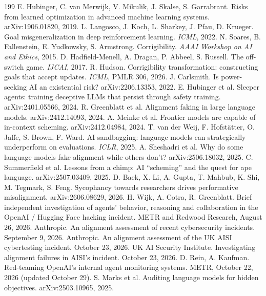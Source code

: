 \documentclass[10pt,twocolumn]{article}
\theoremstyle{plain}
\theoremstyle{definition}
\begin{document}
\begin{thebibliography}{199}
 E. Hubinger, C. van Merwijk, V. Mikulik, J. Skalse, S. Garrabrant. Risks from learned optimization in advanced machine learning systems. arXiv:1906.01820, 2019.
 L. Langosco, J. Koch, L. Sharkey, J. Pfau, D. Krueger. Goal misgeneralization in deep reinforcement learning. \emph{ICML}, 2022.
 N. Soares, B. Fallenstein, E. Yudkowsky, S. Armstrong. Corrigibility. \emph{AAAI Workshop on AI and Ethics}, 2015.
 D. Hadfield-Menell, A. Dragan, P. Abbeel, S. Russell. The off-switch game. \emph{IJCAI}, 2017.
 R. Hudson. Corrigibility transformation: constructing goals that accept updates. \emph{ICML}, PMLR 306, 2026.
 J. Carlsmith. Is power-seeking AI an existential risk? arXiv:2206.13353, 2022.
 E. Hubinger et al. Sleeper agents: training deceptive LLMs that persist through safety training. arXiv:2401.05566, 2024.
 R. Greenblatt et al. Alignment faking in large language models. arXiv:2412.14093, 2024.
 A. Meinke et al. Frontier models are capable of in-context scheming. arXiv:2412.04984, 2024.
 T. van der Weij, F. Hofst\"atter, O. Jaffe, S. Brown, F. Ward. AI sandbagging: language models can strategically underperform on evaluations. \emph{ICLR}, 2025.
 A. Sheshadri et al. Why do some language models fake alignment while others don't? arXiv:2506.18032, 2025.
 C. Summerfield et al. Lessons from a chimp: AI ``scheming'' and the quest for ape language. arXiv:2507.03409, 2025.
 D. Baek, X. Li, A. Gupta, T. Mahbub, K. Shi, M. Tegmark, S. Feng. Sycophancy towards researchers drives performative misalignment. arXiv:2606.08629, 2026.
 H. Wijk, A. Cotra, R. Greenblatt. Brief independent investigation of agents' behavior, reasoning and collaboration in the OpenAI / Hugging Face hacking incident. METR and Redwood Research, August 26, 2026.
 Anthropic. An alignment assessment of recent cybersecurity incidents. September 9, 2026.
 Anthropic. An alignment assessment of the UK AISI cybertesting incident. October 23, 2026.
 UK AI Security Institute. Investigating alignment failures in AISI's incident. October 23, 2026.
 D. Rein, A. Kaufman. Red-teaming OpenAI's internal agent monitoring systems. METR, October 22, 2026 (updated October 29).
 S. Marks et al. Auditing language models for hidden objectives. arXiv:2503.10965, 2025.

\end{thebibliography}
\end{document}
